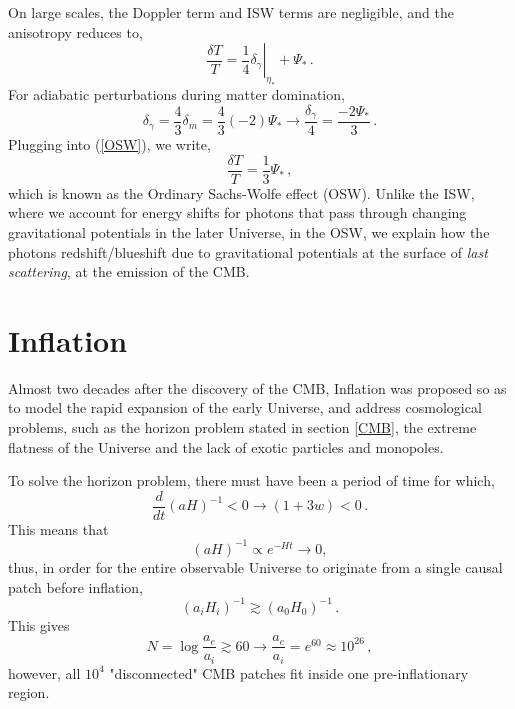 \documentclass{book}
\begin{document}
	On large scales, the Doppler term and ISW terms are negligible, and the anisotropy reduces to,
	\begin{equation}
		\label{OSW}
		\frac{\delta T}{T}=\left. \frac14 \delta_\gamma \right|_{\eta_*}+\Psi_* \, .
	\end{equation}
	For adiabatic perturbations during matter domination, 
	\begin{equation}
		\delta_\gamma=\frac43 \delta_m = \frac43 (-2)\Psi_* \to \frac{\delta_\gamma}{4}=\frac{-2\Psi_*}{3} \, .
	\end{equation}
	Plugging into (\ref{OSW}), we write,
	\begin{equation}
		\frac{\delta T}{T}=\frac13 \Psi_* \, ,
	\end{equation}
	which is known as the Ordinary Sachs-Wolfe effect (OSW). Unlike the ISW, where we account for energy shifts for photons that pass through changing gravitational potentials in the later Universe, in the OSW, we explain how the photons redshift/blueshift due to gravitational potentials at the surface of \textit{last scattering}, at the emission of the CMB.
	\section{Inflation}
	Almost two decades after the discovery of the CMB, Inflation was proposed so as to model the rapid expansion of the early Universe, and address cosmological problems, such as the horizon problem stated in section \ref{CMB}, the extreme flatness of the Universe and the lack of exotic particles and monopoles.
	
	To solve the horizon problem, there must have been a period of time for which,
	\begin{equation}
		\frac{d}{dt}(aH)^{-1}<0 \rightarrow (1+3w)<0 \, .
	\end{equation}
	This means that
	\begin{equation*}
		(aH)^{-1} \propto e^{-Ht} \rightarrow 0,
	\end{equation*}
	thus, in order for the entire observable Universe to originate from a single causal patch before inflation,
	\begin{equation*}
		(a_i H_i)^{-1}\gtrsim (a_0 H_0)^{-1} \, .
	\end{equation*}
	This gives 
	\begin{equation*}
		N=\log\frac{a_e}{a_i}\gtrsim 60 \rightarrow \frac{a_e}{a_i}=e^{60}\approx 10^{26}\, ,
	\end{equation*}
	however, all $10^4$ "disconnected" CMB patches fit inside one pre-inflationary region.
	
\end{document}
